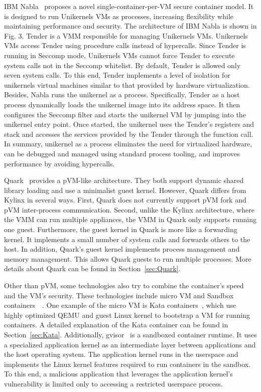 IBM Nabla~\cite*{10.1145/3267809.3267845} proposes a novel single-container-per-VM secure container model. It is designed to run Unikernels VMs as processes, increasing flexibility while maintaining performance and security. The architecture of IBM Nabla is shown in Fig. 3. Tender is a VMM responsible for managing Unikernels VMs. 
Unikernels VMs access Tender using procedure calls instead of hypercalls. Since Tender is running in Seccomp mode, Unikernels VMs cannot force Tender to execute system calls not in the Seccomp whitelist. By default, Tender is allowed only seven system calls. To this end, Tender implements a level 
of isolation for unikernels virtual machines similar to that provided by hardware virtualization. Besides, Nabla runs the unikernel as a process. Specifically, Tender as a host process dynamically loads the unikernel image into its address space. It then configures the Seccomp filter and starts the 
unikernel VM by jumping into the unikernel entry point. Once started, the unikernel uses the Tender's registers and stack and accesses the services provided by the Tender through the function call. In summary, unikernel as a process eliminates the need for virtualized hardware, can be debugged and 
managed using standard process tooling, and improves performance by avoiding hypercalls.

Quark~\cite*{quark} provides a pVM-like architecture. They both support dynamic shared library loading and use a minimalist guest kernel. However, Quark differs from Kylinx in several ways. First, Quark does not currently support pVM fork and pVM inter-process communication. Second, unlike the Kylinx architecture, 
where the VMM can run multiple appliances, the VMM in Quark only supports running one guest. Furthermore, the guest kernel in Quark is more like a forwarding kernel. It implements a small number of system calls and forwards others to the host. In addition, Quark's guest kernel implements process 
management and memory management. This allows Quark guests to run multiple processes. More details about Quark can be found in Section~\ref{sec:Quark}.

Other than pVM, some technologies also try to combine the container's speed and the VM's security. These technologies include micro VM and Sandbox containers~~\cite*{future_container}. One example of the micro VM is Kata containers~\cite*{Kata-Containers}, which use highly optimized QEMU and guest Linux kernel to bootstrap a VM for running containers. 
A detailed explanation of the Kata container can be found in Section~\ref{sec:Kata}. Additionally, gvisor~\cite*{gvisor} is a sandboxed container runtime. It uses a specialized application kernel as an intermediate layer between applications and the host operating system. The application kernel runs in the userspace and 
implements the Linux kernel features required to run containers in the sandbox. To this end, a malicious application that leverages the application kernel's vulnerability is limited only to accessing a restricted userspace process.


